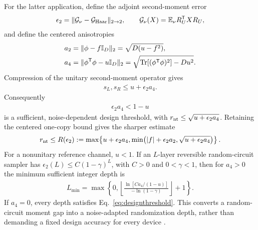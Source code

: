 \documentclass[aps,prl,reprint,superscriptaddress,nofootinbib]{revtex4-2}
\newcommand{\Tr}{\operatorname{Tr}}
\newcommand{\id}{\mathbb{I}}
\newcommand{\E}{\mathbb{E}}
\newcommand{\cG}{\mathcal{G}}
\begin{document}
For the latter application, define the adjoint second-moment error
\begin{align}
 \epsilon_2=\lVert\cG_\nu-\cG_{\rm Haar}\rVert_{2\to2},\qquad
 \cG_\nu(X)=\E_\nu R_U^{\mathsf T}XR_U,
 \label{eq:designerror}
\end{align}
and define the centered anisotropies
\begin{align}
 a_2&=\lVert\phi-f\id_D\rVert_2=\sqrt{D(u-f^2)},\notag\\
 a_4&=\lVert\phi^{\mathsf T}\phi-u\id_D\rVert_2
 =\sqrt{\Tr[(\phi^{\mathsf T}\phi)^2]-Du^2}.
 \label{eq:anisotropies}
\end{align}
Compression of the unitary second-moment operator gives
\begin{align}
 s_L,s_R\leq u+\epsilon_2a_4.
\end{align}
Consequently
\begin{align}
 \epsilon_2a_4<1-u
 \label{eq:designthreshold}
\end{align}
is a sufficient, noise-dependent design threshold, with
$r_{\rm nt}\leq\sqrt{u+\epsilon_2a_4}$.  Retaining the centered one-copy
bound gives the sharper estimate
\begin{align}
 r_{\rm nt}\leq R(\epsilon_2):=
 \max\!\left\{u+\epsilon_2a_4,
 \min\!\left(|f|+\epsilon_2a_2,
 \sqrt{u+\epsilon_2a_4}\right)\right\}.
 \label{eq:refinedapproxrate}
\end{align}
For a nonunitary reference channel, $u<1$.  If an $L$-layer reversible
random-circuit sampler has
$\epsilon_2(L)\leq C(1-\gamma)^L$, with $C>0$ and $0<\gamma<1$, then for
$a_4>0$ the minimum sufficient integer depth is
\begin{align}
 L_{\min}=\max\!\left\{0,
 \left\lfloor\frac{\ln[Ca_4/(1-u)]}{-\ln(1-\gamma)}\right\rfloor+1
 \right\}.
 \label{eq:depth}
\end{align}
If $a_4=0$, every depth satisfies Eq.~\eqref{eq:designthreshold}.  This
converts a random-circuit moment gap into a noise-adapted randomization depth,
rather than demanding a fixed design accuracy for every device
\cite{FrancaHashagen2018,HeinrichEtAl2022}.
\end{document}
